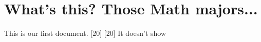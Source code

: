\documentclass{article}
\begin{document}
\author{Super Saiyan}
\date{January 5, 2011}
\section{What's this? \textsf Those Math majors...}
This is our first document.
\mbox [20\width] [20\height] {It doesn't show}
\end{document}
